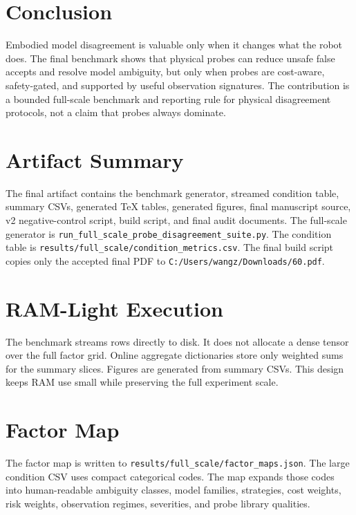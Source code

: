 \documentclass{article}
\begin{document}
\section{Conclusion}

Embodied model disagreement is valuable only when it changes what the robot does. The final benchmark shows that physical probes can reduce unsafe false accepts and resolve model ambiguity, but only when probes are cost-aware, safety-gated, and supported by useful observation signatures. The contribution is a bounded full-scale benchmark and reporting rule for physical disagreement protocols, not a claim that probes always dominate.

\appendix

\section{Artifact Summary}

The final artifact contains the benchmark generator, streamed condition table, summary CSVs, generated TeX tables, generated figures, final manuscript source, v2 negative-control script, build script, and final audit documents. The full-scale generator is \texttt{run\_full\_scale\_probe\_disagreement\_suite.py}. The condition table is \texttt{results/full\_scale/condition\_metrics.csv}. The final build script copies only the accepted final PDF to \texttt{C:/Users/wangz/Downloads/60.pdf}.

\section{RAM-Light Execution}

The benchmark streams rows directly to disk. It does not allocate a dense tensor over the full factor grid. Online aggregate dictionaries store only weighted sums for the summary slices. Figures are generated from summary CSVs. This design keeps RAM use small while preserving the full experiment scale.

\section{Factor Map}

The factor map is written to \texttt{results/full\_scale/factor\_maps.json}. The large condition CSV uses compact categorical codes. The map expands those codes into human-readable ambiguity classes, model families, strategies, cost weights, risk weights, observation regimes, severities, and probe library qualities.
\end{document}

